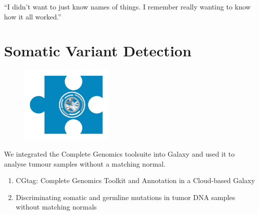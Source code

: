 \begin{savequote}[75mm]
“I didn’t want to just know names of things. I remember really wanting to know how it all worked.”
\end{savequote}

\chapter{Somatic Variant Detection}\label{chapter:virtualnormal}
\setcounter{figure}{-1}
\setcounter{table}{-1}
\setcounter{section}{-1}

\begin{figure}[t!]
\includegraphics[height=10em]{frontmatter/images/chapter-header-4.png}
\end{figure}
\setcounter{figure}{-1}
\setcounter{table}{-1}
\setcounter{section}{-1}

We integrated the Complete Genomics toolsuite into Galaxy and used it to analyse tumour samples without a matching normal.

\begin{enumerate}
\itemsep-0.5em
\item CGtag: Complete Genomics Toolkit and Annotation in a Cloud-based Galaxy
\item Discriminating somatic and germline mutations in tumor DNA samples without matching normals
\end{enumerate}
